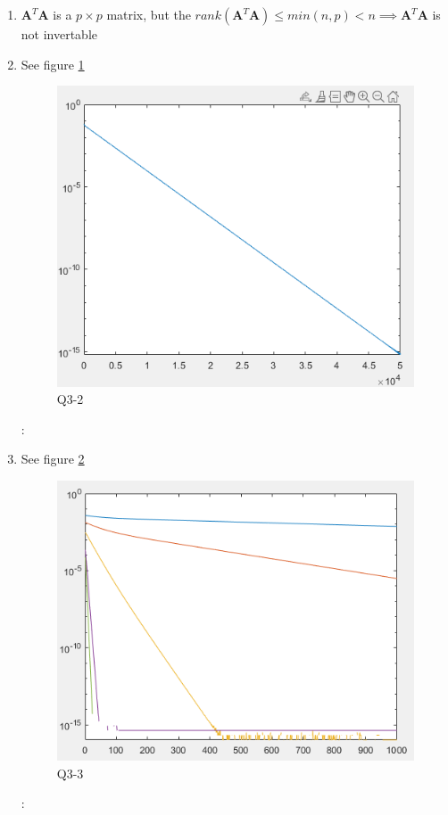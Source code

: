 \documentclass[11pt]{article}
\newcommand{\mfile}[1]  {{\small }} %
\newcommand{\mtx}[1]{\mathbf{#1}}
\def \mA {\mtx{A}}
\begin{document}
	\begin{enumerate}
		\item $\mA^T\mA$ is a $p\times p$ matrix, but the $rank(\mA^T\mA)\leq min(n,p) < n \implies \mA^T\mA$ is not invertable
		\item See figure \ref{fig:Q3_2} 
		\mfile{q3_2.m} 
		\begin{figure}[h!]
			\centering
			\includegraphics[width=0.5\linewidth]{q32.png}
			\caption{Q3-2}
			\label{fig:Q3_2}
		\end{figure}:

		\item See figure \ref{fig:Q3_3} 
		\mfile{q3_3.m} 
		\begin{figure}[h!]
			\centering
			\includegraphics[width=0.5\linewidth]{q3_3.png}
			\caption{Q3-3}
			\label{fig:Q3_3}
		\end{figure}:
	\end{enumerate}
	
\end{document}
